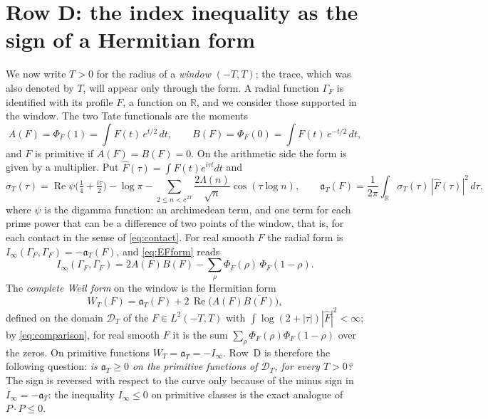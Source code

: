 \documentclass[10pt]{amsart}
\theoremstyle{definition}
\theoremstyle{remark}
\newcommand{\R}{\mathbb R}
\newcommand{\Rel}{\operatorname{Re}}
\begin{document}
\section{Row D: the index inequality as the sign of a Hermitian form}\label{sec:D}
We now write $T>0$ for the radius of a \emph{window} $(-T,T)$; the trace, which was also
denoted by $T$, will appear only through the form. A radial function $\Gamma_F$ is identified
with its profile $F$, a function on $\R$, and we consider those supported in the window. The
two Tate functionals are the moments
\[
 A(F)=\Phi_F(1)=\int F(t)\,e^{t/2}\,dt,\qquad B(F)=\Phi_F(0)=\int F(t)\,e^{-t/2}\,dt ,
\]
and $F$ is primitive if $A(F)=B(F)=0$. On the arithmetic side the form is given by a multiplier.
Put $\widehat F(\tau)=\int F(t)e^{i\tau t}dt$ and
\[
 \sigma_T(\tau)=\Rel\psi\bigl(\tfrac14+\tfrac{i\tau}2\bigr)-\log\pi-\sum_{2\le n<e^{2T}}\frac{2\Lambda(n)}{\sqrt n}\cos(\tau\log n),
 \qquad
 \mathfrak a_T(F)=\frac1{2\pi}\int_{\R}\sigma_T(\tau)\,|\widehat F(\tau)|^2\,d\tau ,
\]
where $\psi$ is the digamma function: an archimedean term, and one term for each prime power
that can be a difference of two points of the window, that is, for each contact in the sense
of \eqref{eq:contact}. For real smooth $F$ the radial form is
$I_\infty(\Gamma_F,\Gamma_F)=-\mathfrak a_T(F)$, and \eqref{eq:EFform} reads
\begin{equation}\label{eq:comparison}
 I_\infty(\Gamma_F,\Gamma_F)=2A(F)B(F)-\sum_\rho\Phi_F(\rho)\,\Phi_F(1-\rho).
\end{equation}
The \emph{complete Weil form} on the window is the Hermitian form
\[
 W_T(F)=\mathfrak a_T(F)+2\,\Rel\bigl(A(F)\overline{B(F)}\bigr),
\]
defined on the domain $\mathcal D_T$ of the $F\in L^2(-T,T)$ with
$\int\log(2+|\tau|)|\widehat F|^2<\infty$; by \eqref{eq:comparison}, for real smooth $F$ it is the
sum $\sum_\rho\Phi_F(\rho)\Phi_F(1-\rho)$ over the zeros.
On primitive functions $W_T=\mathfrak a_T=-I_\infty$. Row~D is therefore the following
question: \emph{is $\mathfrak a_T\ge0$ on the primitive functions of $\mathcal D_T$, for every
$T>0$?} The sign is reversed with respect to the curve only because of the minus sign in
$I_\infty=-\mathfrak a_T$: the inequality $I_\infty\le0$ on primitive classes is the exact
analogue of $P\cdot P\le0$.
\end{document}
